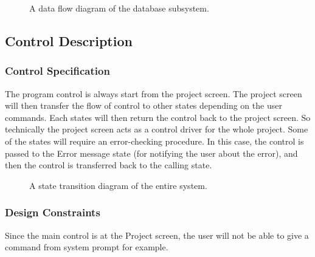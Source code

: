 \begin{figure}
\centering
\centerline{}
\caption[Data flow Diagram of Database Subsystem]{\label{db-dfd} 
A data flow diagram of the database subsystem.}
\end{figure}


\subsection{Control Description}

\subsubsection{Control Specification}

The program control is always start from the project screen. The project
screen will then transfer the flow of control to other states depending
on the user commands. Each states will then return the control back to
the project screen. So technically the project screen acts as a control
driver for the whole project. Some of the states will require an error-checking
procedure. In this case, the control is passed to the Error message state (for
notifying the user about the error), and then the control is transferred back
to the calling state.

\begin{figure}
\centering
\centerline{}
\caption[State Transition Diagram]{\label{sysstates} 
A state transition diagram of the entire system.}
\end{figure}

\subsubsection{Design Constraints}

Since the main control is at the Project screen, the user will not be able
to give a command from system prompt for example.


